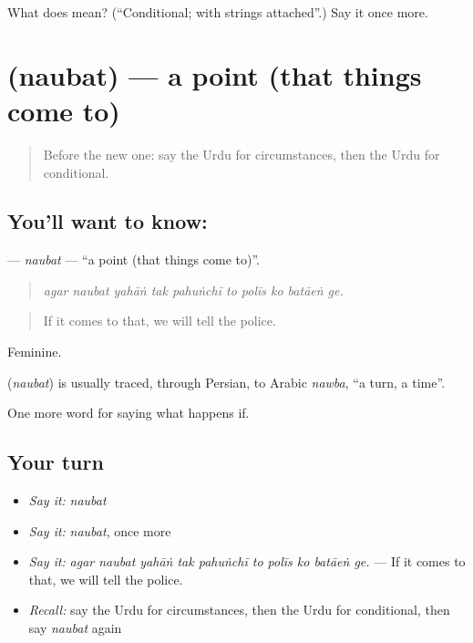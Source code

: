\begin{tcolorbox}[breakable,colback=teal!4,colframe=teal!35!black,title={Before you move on}]
What does  mean? (\textquotedblleft{}Conditional; with strings attached\textquotedblright{}.) Say it once more.
\end{tcolorbox}
\section[\texorpdfstring{\ur{نوبت} (naubat)}{نوبت (naubat)}]{ (naubat) — a point (that things come to)}

\label{lesson:UR-C541-naubat}



\begin{quote}
Before the new one: say the Urdu for circumstances, then the Urdu for conditional.
\end{quote}

\subsection*{You'll want to know: }
\textbf{} — \emph{naubat} — \textquotedblleft{}a point (that things come to)\textquotedblright{}.

\begin{quote}
         
\end{quote}

\begin{quote}
\emph{agar naubat yahāṅ tak pahuṅchī to polīs ko batāeṅ ge.}
\end{quote}

\begin{quote}
If it comes to that, we will tell the police.
\end{quote}

Feminine.

\begin{cousinweb}
\textbf{} (\emph{naubat}) is usually traced, through Persian, to Arabic \emph{nawba}, \textquotedblleft{}a turn, a time\textquotedblright{}.
\end{cousinweb}

\begin{grammarlens}[title={What you've built}]
One more word for saying what happens if.
\end{grammarlens}

\subsection*{Your turn}
\begin{itemize}
\raggedright
  \item \emph{Say it:} \emph{naubat}
  \item \emph{Say it:} \emph{naubat}, once more
  \item \emph{Say it:} \emph{agar naubat yahāṅ tak pahuṅchī to polīs ko batāeṅ ge.} — If it comes to that, we will tell the police.
  \item \emph{Recall:} say the Urdu for circumstances, then the Urdu for conditional, then say \emph{naubat} again
\end{itemize}

